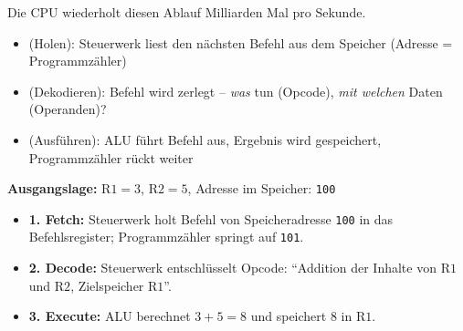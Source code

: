 \begin{frame}
\begin{center}

\end{center}
\begin{center}Die \gls{CPU} wiederholt diesen Ablauf Milliarden Mal pro Sekunde.\end{center}
\end{frame}

\begin{frame}
\begin{itemize}[<+->]\setlength\itemsep{6pt}
  \item {} (Holen): Steuerwerk liest den nächsten Befehl aus dem Speicher (Adresse = Programmzähler)
  \item {} (Dekodieren): Befehl wird zerlegt -- \emph{was} tun (Opcode), \emph{mit welchen} Daten (Operanden)?
  \item {} (Ausführen): \gls{ALU} führt Befehl aus, Ergebnis wird gespeichert, Programmzähler rückt weiter
\end{itemize}
\end{frame}

\begin{frame}
\textbf{Ausgangslage:} $\text{R1} = 3$, $\text{R2} = 5$, Adresse im Speicher: \texttt{100}
\vspace{3mm}
\begin{itemize}[<+->]\setlength\itemsep{6pt}
    \item \textbf{1. Fetch:} Steuerwerk holt Befehl von Speicheradresse \texttt{100} in das Befehlsregister; Programmzähler springt auf \texttt{101}.
    \item \textbf{2. Decode:} Steuerwerk entschlüsselt Opcode: \enquote{Addition der Inhalte von $\text{R1}$ und $\text{R2}$, Zielspeicher $\text{R1}$}.
    \item \textbf{3. Execute:} \gls{ALU} berechnet $3 + 5 = 8$ und speichert $8$ in $\text{R1}$.
\end{itemize}
\end{frame}

